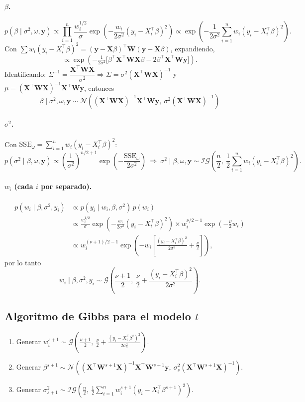 \documentclass[11pt]{article}
\newcommand{\N}{\mathcal{N}}
\newcommand{\IG}{\mathcal{IG}}
\newcommand{\Ga}{\mathcal{G}}
\newcommand{\bX}{\mathbf{X}}
\newcommand{\by}{\mathbf{y}}
\newcommand{\bW}{\mathbf{W}}
\theoremstyle{definition}
\begin{document}
\paragraph{$\beta$.}
\[
p(\beta\mid\sigma^2,\omega,\by)\propto\prod_{i=1}^n\frac{w_i^{1/2}}{\sigma}\exp\!\left(-\frac{w_i}{2\sigma^2}(y_i-X_i^{\top}\beta)^2\right)\propto\exp\!\left(-\frac{1}{2\sigma^2}\sum_{i=1}^n w_i(y_i-X_i^{\top}\beta)^2\right).
\]
Con $\sum w_i(y_i-X_i^{\top}\beta)^2=(\by-\bX\beta)^{\top}\bW(\by-\bX\beta)$, expandiendo,
\[
\propto\exp\!\left(-\tfrac{1}{2\sigma^2}\big[\beta^{\top}\bX^{\top}\bW\bX\beta-2\beta^{\top}\bX^{\top}\bW\by\big]\right).
\]
Identificando: $\Sigma^{-1}=\dfrac{\bX^{\top}\bW\bX}{\sigma^2}\Rightarrow\Sigma=\sigma^2(\bX^{\top}\bW\bX)^{-1}$ y $\mu=(\bX^{\top}\bW\bX)^{-1}\bX^{\top}\bW\by$, entonces
\[
\boxed{\ \beta\mid\sigma^2,\omega,\by\sim\N\!\left((\bX^{\top}\bW\bX)^{-1}\bX^{\top}\bW\by,\ \sigma^2(\bX^{\top}\bW\bX)^{-1}\right)\ }
\]

\paragraph{$\sigma^2$.} Con $\text{SSE}_\omega=\sum_{i=1}^n w_i(y_i-X_i^{\top}\beta)^2$:
\[
p(\sigma^2\mid\beta,\omega,\by)\propto\left(\frac{1}{\sigma^2}\right)^{n/2+1}\exp\!\left(-\frac{\text{SSE}_\omega}{2\sigma^2}\right)
\ \Rightarrow\ \sigma^2\mid\beta,\omega,\by\sim\IG\!\left(\frac{n}{2},\ \frac{1}{2}\sum_{i=1}^n w_i(y_i-X_i^{\top}\beta)^2\right).
\]

\paragraph{$w_i$ (cada $i$ por separado).}
\begin{align*}
p(w_i\mid\beta,\sigma^2,y_i)&\propto p(y_i\mid w_i,\beta,\sigma^2)\,p(w_i)\\
&\propto\frac{w_i^{1/2}}{\sigma}\exp\!\left(-\frac{w_i}{2\sigma^2}(y_i-X_i^{\top}\beta)^2\right)\times w_i^{\nu/2-1}\exp\!\left(-\frac{\nu}{2}w_i\right)\\
&\propto w_i^{(\nu+1)/2-1}\exp\!\left(-w_i\left[\frac{(y_i-X_i^{\top}\beta)^2}{2\sigma^2}+\frac{\nu}{2}\right]\right),
\end{align*}
por lo tanto
\[
w_i\mid\beta,\sigma^2,y_i\sim\Ga\!\left(\frac{\nu+1}{2},\ \frac{\nu}{2}+\frac{(y_i-X_i^{\top}\beta)^2}{2\sigma^2}\right).
\]

\subsection{Algoritmo de Gibbs para el modelo $t$}
\begin{enumerate}[leftmargin=2em]
  \item Generar $w_i^{s+1}\sim\Ga\!\left(\tfrac{\nu+1}{2},\ \tfrac{\nu}{2}+\tfrac{(y_i-X_i^{\top}\beta^s)^2}{2\sigma_s^2}\right)$.
  \item Generar $\beta^{s+1}\sim\N\!\left((\bX^{\top}\bW^{s+1}\bX)^{-1}\bX^{\top}\bW^{s+1}\by,\ \sigma_s^2(\bX^{\top}\bW^{s+1}\bX)^{-1}\right)$.
  \item Generar $\sigma^2_{s+1}\sim\IG\!\left(\tfrac{n}{2},\ \tfrac12\sum_{i=1}^n w_i^{s+1}(y_i-X_i^{\top}\beta^{s+1})^2\right)$.
\end{enumerate}
\end{document}
